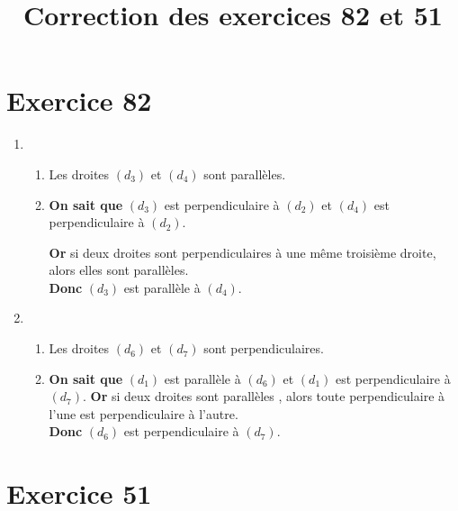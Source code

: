 \documentclass[12pt,a4paper]{article}
\title{Correction des exercices 82 et 51}
\date{}
\begin{document}
	
	\maketitle
	
	\section*{Exercice 82}
	\begin{enumerate}[label=\arabic*)]
		\item \begin{enumerate}[label=\alph*)]
			\item Les droites $(d_3)$ et $(d_4)$ sont parallèles.
			
			\item 
			\textbf{On sait que} $(d_3)$ est perpendiculaire à $(d_2)$ et $(d_4)$ est perpendiculaire à $(d_2)$. %
			
			\textbf{Or} si deux droites sont perpendiculaires à une même troisième droite, alors elles sont parallèles.\\
			\textbf{Donc} $(d_3)$ est parallèle à $(d_4)$. %
		\end{enumerate}
	
	
		\item \begin{enumerate}[label=\alph*)]
			\item Les droites $(d_6)$ et $(d_7)$ sont perpendiculaires.
			
			\item 
			\textbf{On sait que} $(d_1)$ est parallèle à $(d_6)$ et $(d_1)$ est perpendiculaire à $(d_7)$. %
			\textbf{Or} si deux droites sont parallèles , alors toute perpendiculaire à l'une est perpendiculaire à l'autre.\\
			\textbf{Donc} $(d_6)$ est perpendiculaire à $(d_7)$. %
		\end{enumerate}
	\end{enumerate}

	\section*{Exercice 51}
	
\end{document}
